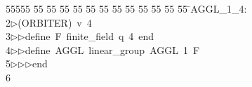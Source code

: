 %
%
\begin{tabbing}
55555 \= 55 \= 55 \= 55 \= 55 \= 55 \= 55 \= 55 \= 55 \= 55 \= 55 \= 55 \= 55 \= \>AGGL\_1\_4:\\[0pt]
2\>$\triangleright$\>(ORBITER)\ v\ 4\ \\[0pt]
3\>$\triangleright$\>$\triangleright$\>define\ F\ finite\_field\ q\ 4\ end\ \\[0pt]
4\>$\triangleright$\>$\triangleright$\>define\ AGGL\ linear\_group\ AGGL\ 1\ F\ \\[0pt]
5\>$\triangleright$\>$\triangleright$\>$\triangleright$\>end\\[0pt]
6\>\end{tabbing}
